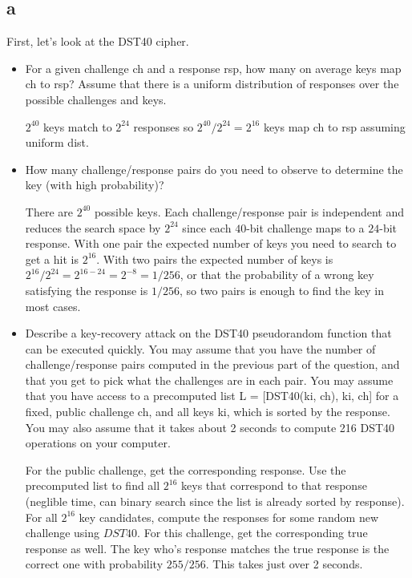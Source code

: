 \documentclass[11pt]{article}
\begin{document}
\subsection{a}

First, let's look at the DST40 cipher.
\begin{itemize}
  \item For a given challenge ch and a response rsp, how many on average keys map ch to rsp? Assume that there is a uniform distribution of responses over the possible challenges and keys.

  $2^{40}$ keys match to $2^{24}$ responses so $2^{40} / 2^{24} = 2^{16}$ keys map ch to rsp assuming uniform dist.

  \item How many challenge/response pairs do you need to observe to determine the key (with high probability)?
  
  There are $2^{40}$ possible keys. Each challenge/response pair is independent and reduces the search space by $2^{24}$ since each $40$-bit challenge maps to a $24$-bit response. With one pair the expected number of keys you need to search to get a hit is $2^{16}$. With two pairs the expected number of keys is $2^{16} / 2^{24} = 2^{16 - 24} = 2^{-8} = 1/256$, or that the probability of a wrong key satisfying the response is $1/256$, so two pairs is enough to find the key in most cases.

  \item Describe a key-recovery attack on the DST40 pseudorandom function that can be executed quickly. You may assume that you have the number of challenge/response pairs computed in the previous part of the question, and that you get to pick what the challenges are in each pair. You may assume that you have access to a precomputed list L = [DST40(ki, ch), ki, ch] for a fixed, public challenge ch, and all keys ki, which is sorted by the response. You may also assume that it takes about 2 seconds to compute 216 DST40 operations on your computer.
  
  For the public challenge, get the corresponding response. Use the precomputed list to find all $2^{16}$ keys that correspond to that response (neglible time, can binary search since the list is already sorted by response). For all $2^{16}$ key candidates, compute the responses for some random new challenge using $DST40$. For this challenge, get the corresponding true response as well. The key who's response matches the true response is the correct one with probability $255/256$. This takes just over 2 seconds.  

\end{itemize}
\end{document}
